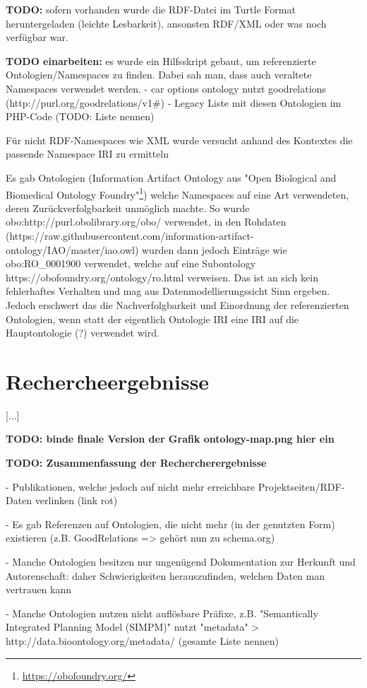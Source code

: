 \documentclass{article}
\begin{document}
\textbf{TODO:} sofern vorhanden wurde die RDF-Datei im Turtle Format heruntergeladen (leichte Lesbarkeit), ansonsten RDF/XML oder was noch verfügbar war.

\textbf{TODO einarbeiten:} es wurde ein Hilfsskript gebaut, um referenzierte Ontologien/Namespaces zu finden. Dabei sah man, dass auch veraltete Namespaces verwendet werden.
- car options ontology nutzt goodrelations (http://purl.org/goodrelations/v1\#) - Legacy Liste mit diesen Ontologien im PHP-Code (TODO: Liste nennen)

Für nicht RDF-Namespaces wie XML wurde versucht anhand des Kontextes die passende Namespace IRI zu ermitteln

Es gab Ontologien (Information Artifact Ontology aus "Open Biological and Biomedical Ontology Foundry"\footnote{\url{https://obofoundry.org/}}) welche Namespaces auf eine Art verwendeten, deren Zurückverfolgbarkeit unmöglich machte.
So wurde obo:http://purl.obolibrary.org/obo/ verwendet, in den Rohdaten (https://raw.githubusercontent.com/information-artifact-ontology/IAO/master/iao.owl) wurden dann jedoch Einträge wie obo:RO\_0001900 verwendet, welche auf eine Subontology https://obofoundry.org/ontology/ro.html verweisen.
Das ist an sich kein fehlerhaftes Verhalten und mag aus Datenmodellierungssicht Sinn ergeben.
Jedoch erschwert das die Nachverfolgbarkeit und Einordnung der referenzierten Ontologien, wenn statt der eigentlich Ontologie IRI eine IRI auf die Hauptontologie (?) verwendet wird.

\section{Rechercheergebnisse}

[...]

\textbf{TODO: binde finale Version der Grafik ontology-map.png hier ein}

\textbf{TODO: Zusammenfassung der Rechercherergebnisse}

- Publikationen, welche jedoch auf nicht mehr erreichbare Projektseiten/RDF-Daten verlinken (link rot)

- Es gab Referenzen auf Ontologien, die nicht mehr (in der genutzten Form) existieren (z.B. GoodRelations => gehört nun zu schema.org)

- Manche Ontologien besitzen nur ungenügend Dokumentation zur Herkunft und Autorenschaft: daher Schwierigkeiten herauszufinden, welchen Daten man vertrauen kann

- Manche Ontologien nutzen nicht auflösbare Präfixe, z.B. "Semantically Integrated Planning Model (SIMPM)" nutzt "metadata" > http://data.bioontology.org/metadata/ (gesamte Liste nennen)
\end{document}
